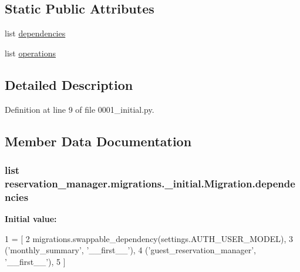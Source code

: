 \subsection*{Static Public Attributes}
\begin{DoxyCompactItemize}
\item 
list \hyperlink{classreservation__manager_1_1migrations_1_10001__initial_1_1Migration_a893e00bdf8a569b5db855e7751d8a4e1}{dependencies}
\item 
list \hyperlink{classreservation__manager_1_1migrations_1_10001__initial_1_1Migration_a6b2b9d5849cacfafc36325f1f2629f65}{operations}
\end{DoxyCompactItemize}


\subsection{Detailed Description}


Definition at line 9 of file 0001\-\_\-initial.\-py.



\subsection{Member Data Documentation}
\hypertarget{classreservation__manager_1_1migrations_1_10001__initial_1_1Migration_a893e00bdf8a569b5db855e7751d8a4e1}{
\subsubsection[{dependencies}]{\setlength{\rightskip}{0pt plus 5cm}list reservation\-\_\-manager.\-migrations.\-\_\-initial.\-Migration.\-dependencies\hspace{0.3cm}{\ttfamily [static]}}}\label{classreservation__manager_1_1migrations_1_10001__initial_1_1Migration_a893e00bdf8a569b5db855e7751d8a4e1}
{\bfseries Initial value\-:}
\begin{DoxyCode}
1 = [
2         migrations.swappable\_dependency(settings.AUTH\_USER\_MODEL),
3         (\textcolor{stringliteral}{'monthly\_summary'}, \textcolor{stringliteral}{'\_\_first\_\_'}),
4         (\textcolor{stringliteral}{'guest\_reservation\_manager'}, \textcolor{stringliteral}{'\_\_first\_\_'}),
5     ]
\end{DoxyCode}


